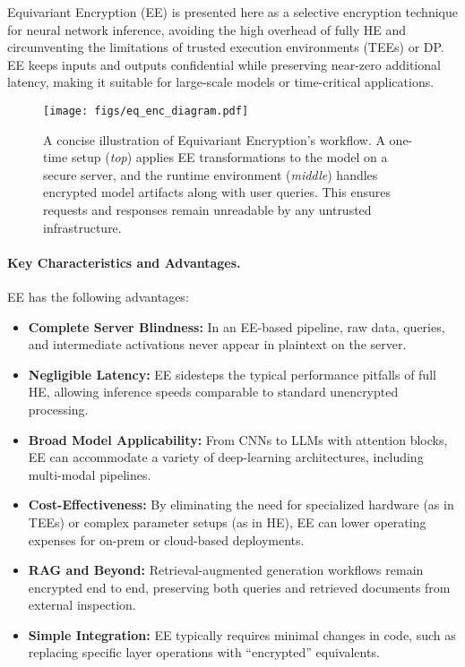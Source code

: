 \documentclass[10pt]{article}
\begin{document}
Equivariant Encryption (EE) is presented here as a selective encryption technique for neural network inference, avoiding the high overhead of fully HE and circumventing the limitations of trusted execution environments (TEEs) or DP. 
EE keeps inputs and outputs confidential while preserving near-zero additional latency, making it suitable for large-scale models or time-critical applications.


\begin{figure}[!ht]
  \centering
  \texttt{[image: figs/eq\_enc\_diagram.pdf]}
  \caption{%
    A concise illustration of Equivariant Encryption’s workflow. 
    A one-time setup (\emph{top}) applies EE transformations to the model on a secure server,
    and the runtime environment (\emph{middle}) handles encrypted model artifacts
    along with user queries. This ensures requests and responses remain unreadable 
    by any untrusted infrastructure.
  }
  \label{fig:ee_diagram}
\end{figure}

\paragraph{Key Characteristics and Advantages.} EE has the following advantages:
\begin{itemize}
    \item \textbf{Complete Server Blindness:} In an EE-based pipeline, raw data, queries, and intermediate activations never appear in plaintext on the server.
    \item \textbf{Negligible Latency:} EE sidesteps the typical performance pitfalls of full HE, allowing inference speeds comparable to standard unencrypted processing.
    \item \textbf{Broad Model Applicability:} From CNNs to LLMs with attention blocks, EE can accommodate a variety of deep-learning architectures, including multi-modal pipelines.
    \item \textbf{Cost-Effectiveness:} By eliminating the need for specialized hardware (as in TEEs) or complex parameter setups (as in HE), EE can lower operating expenses for on-prem or cloud-based deployments.
    \item \textbf{RAG and Beyond:} Retrieval-augmented generation workflows remain encrypted end to end, preserving both queries and retrieved documents from external inspection.
    \item \textbf{Simple Integration:} EE typically requires minimal changes in code, such as replacing specific layer operations with “encrypted” equivalents. 
\end{itemize}
\end{document}
